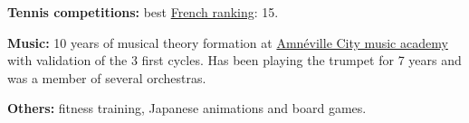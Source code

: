 \documentclass[12pt,a4paper]{article} %
\begin{document}

\inlineheadsection %
{\textbf{Tennis competitions:}} 
{best {\href{http://www.lequipe.fr/Ilosport/Archives/Actualites/Comprendre-le-classement-francais/742514}{French ranking}}: 15.}

\inlineheadsection
{\textbf{Music:}}
{10 years of musical theory formation at {\href{http://www.amneville-les-thermes.com/le-conservatoire-de-musique-et-de-danse}{Amnéville City music academy}} with validation of the 3 first cycles. Has been playing the trumpet for 7 years and was a member of several orchestras.}

\inlineheadsection
{\textbf{Others:}}
{fitness training, Japanese animations and board games.}

\end{document}

